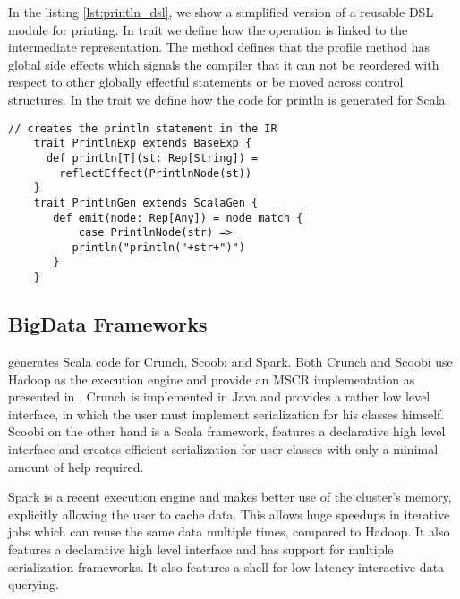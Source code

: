 In the listing \ref{lst:println_dsl}, we show a simplified version of a reusable DSL module for printing. In trait  we define how the  operation is linked to the intermediate representation. The  method defines that the profile method has global side effects which signals the compiler that it can not be reordered with respect to other globally effectful statements or be moved across control structures. In the  trait we define how the code for println is generated for Scala. 

\begin{lstlisting}[name=code, caption=Example of how the DSL module is specified. The module is used for profiling a block of code and can be reused in any other Scala backed DSL. \scode{Rep} types., captionpos=b, label=lst:println_dsl, float=t]
    // creates the println statement in the IR
    trait PrintlnExp extends BaseExp {
      def println[T](st: Rep[String]) =
        reflectEffect(PrintlnNode(st)) 
    }
    trait PrintlnGen extends ScalaGen {
       def emit(node: Rep[Any]) = node match {
           case PrintlnNode(str) =>
	      println("println("+str+")")
       }
    }
\end{lstlisting}

\subsection{BigData Frameworks}
\tool generates Scala code for Crunch, Scoobi and Spark. Both Crunch and Scoobi use Hadoop as the execution engine and provide an MSCR implementation as presented in \cite{chambers_flumejava:_2010}. Crunch is implemented in Java and provides a rather low level interface, in which the user must implement serialization for his classes himself. Scoobi on the other hand is a Scala framework, features a declarative high level interface and creates efficient serialization for user classes with only a minimal amount of help required. 

Spark is a recent execution engine and makes better use of the cluster's memory, explicitly allowing the user to cache data. This allows huge speedups in iterative jobs which can reuse the same data multiple times, compared to Hadoop. It also features a declarative high level interface and has support for multiple serialization frameworks. It also features a shell for low latency interactive data querying.

